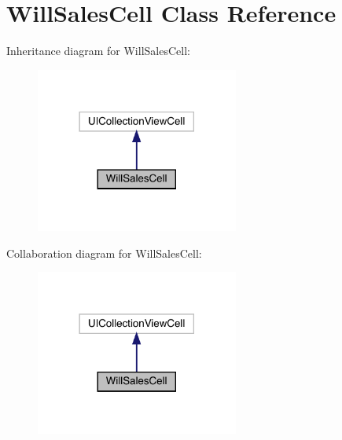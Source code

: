 \hypertarget{interface_will_sales_cell}{}\section{Will\+Sales\+Cell Class Reference}
\label{interface_will_sales_cell}


Inheritance diagram for Will\+Sales\+Cell\+:\nopagebreak
\begin{figure}[H]
\begin{center}
\leavevmode
\includegraphics[width=189pt]{interface_will_sales_cell__inherit__graph}
\end{center}
\end{figure}


Collaboration diagram for Will\+Sales\+Cell\+:\nopagebreak
\begin{figure}[H]
\begin{center}
\leavevmode
\includegraphics[width=189pt]{interface_will_sales_cell__coll__graph}
\end{center}
\end{figure}
